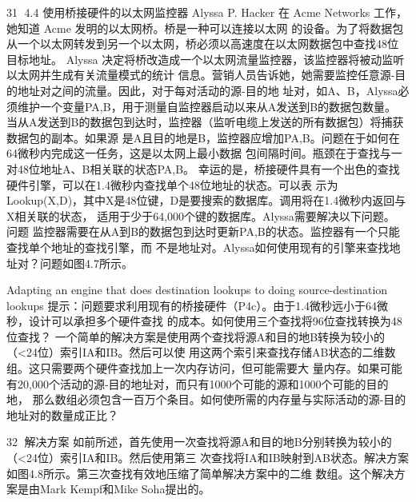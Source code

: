                                                                               31
4.4 使用桥接硬件的以太网监控器
Alyssa P. Hacker 在 Acme Networks 工作，她知道 Acme 发明的以太网桥。桥是一种可以连接以太网
的设备。为了将数据包从一个以太网转发到另一个以太网，桥必须以高速度在以太网数据包中查找48位
目标地址。
Alyssa 决定将桥改造成一个以太网流量监控器，该监控器将被动监听以太网并生成有关流量模式的统计
信息。营销人员告诉她，她需要监控任意源-目的地址对之间的流量。因此，对于每对活动的源-目的地
址对，如A、B，Alyssa必须维护一个变量PA,B，用于测量自监控器启动以来从A发送到B的数据包数量。
当从A发送到B的数据包到达时，监控器（监听电缆上发送的所有数据包）将捕获数据包的副本。如果源
是A且目的地是B，监控器应增加PA,B。问题在于如何在64微秒内完成这一任务，这是以太网上最小数据
包间隔时间。瓶颈在于查找与一对48位地址A、B相关联的状态PA,B。
幸运的是，桥接硬件具有一个出色的查找硬件引擎，可以在1.4微秒内查找单个48位地址的状态。可以表
示为Lookup(X,D)，其中X是48位键，D是要搜索的数据库。调用将在1.4微秒内返回与X相关联的状态，
适用于少于64,000个键的数据库。Alyssa需要解决以下问题。
问题
监控器需要在从A到B的数据包到达时更新PA,B的状态。监控器有一个只能查找单个地址的查找引擎，而
不是地址对。Alyssa如何使用现有的引擎来查找地址对？问题如图4.7所示。




Adapting an engine that does destination lookups to doing source-destination lookups
提示：问题要求利用现有的桥接硬件（P4c）。由于1.4微秒远小于64微秒，设计可以承担多个硬件查找
的成本。如何使用三个查找将96位查找转换为48位查找？
一个简单的解决方案是使用两个查找将源A和目的地B转换为较小的（<24位）索引IA和IB。然后可以使
用这两个索引来查找存储AB状态的二维数组。这只需要两个硬件查找加上一次内存访问，但可能需要大
量内存。如果可能有20,000个活动的源-目的地址对，而只有1000个可能的源和1000个可能的目的地，
那么数组必须包含一百万个条目。如何使所需的内存量与实际活动的源-目的地址对的数量成正比？


                                                                                   32
解决方案
如前所述，首先使用一次查找将源A和目的地B分别转换为较小的（<24位）索引IA和IB。然后使用第三
次查找将IA和IB映射到AB状态。解决方案如图4.8所示。第三次查找有效地压缩了简单解决方案中的二维
数组。这个解决方案是由Mark Kempf和Mike Soha提出的。




